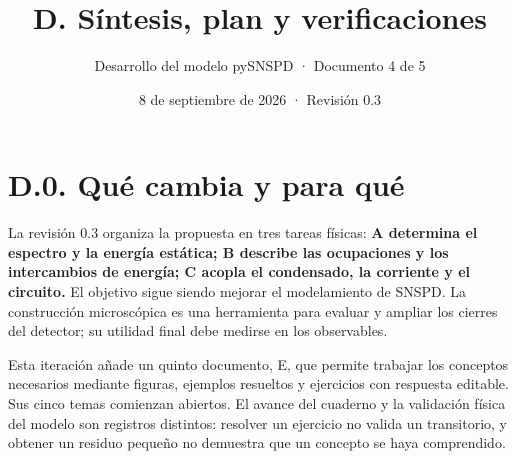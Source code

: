 \documentclass[
  spanish,
  10pt,
  a4paper,
]{article}
\title{D. Síntesis, plan y verificaciones}
\subtitle{Desarrollo del modelo pySNSPD · Documento 4 de 5}
\author{}
\date{8 de septiembre de 2026 · Revisión 0.3}
\begin{document}
\maketitle

{
\setcounter{tocdepth}{2}
\tableofcontents
}
\newpage

\section{D.0. Qué cambia y para
qué}\label{d.0.-quuxe9-cambia-y-para-quuxe9}

La revisión 0.3 organiza la propuesta en tres tareas físicas: \textbf{A
determina el espectro y la energía estática; B describe las ocupaciones
y los intercambios de energía; C acopla el condensado, la corriente y el
circuito.} El objetivo sigue siendo mejorar el modelamiento de SNSPD. La
construcción microscópica es una herramienta para evaluar y ampliar los
cierres del detector; su utilidad final debe medirse en los observables.

Esta iteración añade un quinto documento, E, que permite trabajar los
conceptos necesarios mediante figuras, ejemplos resueltos y ejercicios
con respuesta editable. Sus cinco temas comienzan abiertos. El avance
del cuaderno y la validación física del modelo son registros distintos:
resolver un ejercicio no valida un transitorio, y obtener un residuo
pequeño no demuestra que un concepto se haya comprendido.
\end{document}
